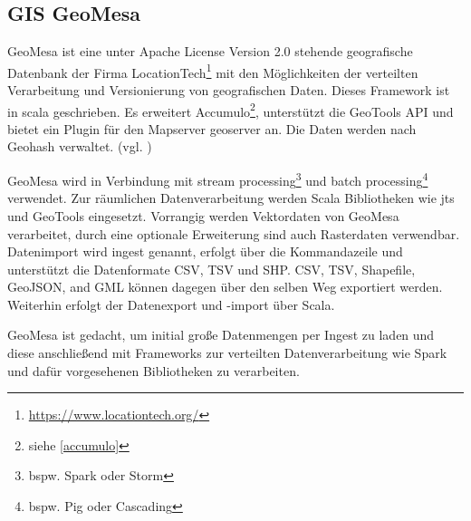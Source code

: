 \subsection{GIS GeoMesa}

GeoMesa ist eine unter Apache License Version 2.0 stehende geografische Datenbank der Firma LocationTech\footnote{\url{https://www.locationtech.org/}} mit den Möglichkeiten der verteilten Verarbeitung und Versionierung von geografischen Daten.
Dieses Framework ist in \Gls{scala} geschrieben.
Es erweitert Accumulo\footnote{siehe \ref{accumulo}}, unterstützt die GeoTools API und bietet ein Plugin für den Mapserver \Gls{geoserver} an.
Die Daten werden nach Geohash %
verwaltet. (vgl. \cite{website:geomesaeclipse})

GeoMesa wird in Verbindung mit stream processing\footnote{bspw. Spark oder Storm} und batch processing\footnote{bspw. Pig oder Cascading} verwendet.
Zur räumlichen Datenverarbeitung werden Scala Bibliotheken wie \Gls{jts} und GeoTools eingesetzt.
Vorrangig werden Vektordaten von GeoMesa verarbeitet, durch eine optionale Erweiterung sind auch Rasterdaten verwendbar.
Datenimport wird ingest genannt, erfolgt über die Kommandazeile und unterstützt die Datenformate CSV, TSV und SHP.
CSV, TSV, Shapefile, GeoJSON, and GML können dagegen über den selben Weg exportiert werden.
Weiterhin erfolgt der Datenexport und -import über Scala.

GeoMesa ist gedacht, um initial große Datenmengen per Ingest zu laden und diese anschließend mit Frameworks zur verteilten Datenverarbeitung wie Spark und dafür vorgesehenen Bibliotheken zu verarbeiten.
%
%
%
%





